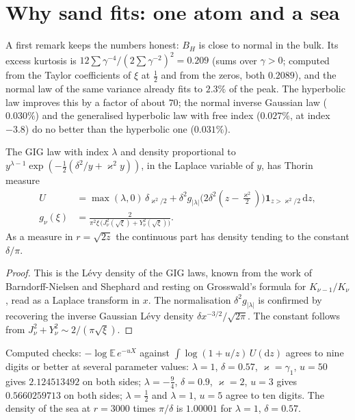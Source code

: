\section{Why sand fits: one atom and a sea}\label{bn:sec:sea}
A first remark keeps the numbers honest: $B_H$ is close to normal in the bulk. Its excess kurtosis is $12\sum\gamma^{-4}/(2\sum\gamma^{-2})^2=0.209$ (sums over $\gamma>0$; computed from the Taylor coefficients of $\xi$ at $\frac12$ and from the zeros, both $0.2089$), and the normal law of the same variance already fits to $2.3\%$ of the peak. The hyperbolic law improves this by a factor of about $70$; the normal inverse Gaussian law ($0.030\%$) and the generalised hyperbolic law with free index ($0.027\%$, at index $-3.8$) do no better than the hyperbolic one ($0.031\%$). %
\begin{theorem}\label{bn:thm:gig}
The GIG law with index $\lambda$ and density proportional to $y^{\lambda-1}\exp(-\frac12(\delta^2/y+\varkappa^2y))$, in the Laplace variable of $y$, has Thorin measure
\begin{align*}
U&=\max(\lambda,0)\,\delta_{\varkappa^2/2}+\delta^2g_{|\lambda|}\bigl(2\delta^2(z-\tfrac{\varkappa^2}2)\bigr)\mathbf 1_{z>\varkappa^2/2}\,\mathrm dz,\\
g_\nu(\xi)&=\frac{2}{\pi^2\xi\,\bigl(J_\nu^2(\sqrt\xi)+Y_\nu^2(\sqrt\xi)\bigr)}.
\end{align*}
As a measure in $r=\sqrt{2z}$ the continuous part has density tending to the constant $\delta/\pi$.
\end{theorem}
\begin{proof}
This is the L\'evy density of the GIG laws, known from the work of Barndorff-Nielsen and Shephard and resting on Grosswald's formula for $K_{\nu-1}/K_\nu$ \cite{Grosswald76a,Ismail77,BNS01}, read as a Laplace transform in $x$. The normalisation $\delta^2g_{|\lambda|}$ is confirmed by recovering the inverse Gaussian L\'evy density $\delta x^{-3/2}/\sqrt{2\pi}$. The constant follows from $J_\nu^2+Y_\nu^2\sim2/(\pi\sqrt\xi)$.
\end{proof}
\noindent Computed checks: $-\log\mathbb E\,e^{-uX}$ against $\int\log(1+u/z)\,U(\mathrm dz)$ agrees to nine digits or better at several parameter values: $\lambda=1$, $\delta=0.57$, $\varkappa=\gamma_1$, $u=50$ gives $2.124513492$ on both sides; $\lambda=-\frac94$, $\delta=0.9$, $\varkappa=2$, $u=3$ gives $0.5660259713$ on both sides; $\lambda=\frac12$ and $\lambda=1$, $u=5$ agree to ten digits. The density of the sea at $r=3000$ times $\pi/\delta$ is $1.00001$ for $\lambda=1$, $\delta=0.57$.
